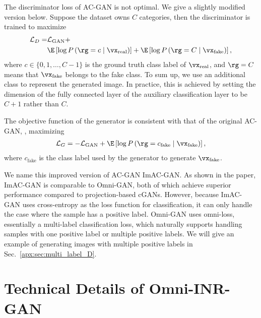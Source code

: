 \documentclass[paper_2425.tex]{subfiles}
\begin{document}
The discriminator loss of AC-GAN is not optimal. We give a slightly modified version below. Suppose the dataset owns $C$ categories, then the discriminator is trained to maximize
\begin{equation}
  \begin{aligned}
    \mathcal{L}_{{D}} = & \mathcal{L}_{\text{GAN}} +                                         \\
                        & \E \left[ \log P\left(\rg=c \mid \vx_{\text{real}}\right) \right]+
    \E \left[ \log P\left(\rg=C \mid \vx_{\text{fake}}\right) \right],
  \end{aligned}
\end{equation}
where $c \in \{0, 1, \dots, C-1\}$ is the ground truth class label of $\vx_{\text{real}}$, and $\rg=C$ means that $\vx_{\text{fake}}$ belongs to the fake class. To sum up, we use an additional class to represent the generated image. In practice, this is achieved by setting the dimension of the fully connected layer of the auxiliary classification layer to be $C+1$ rather than $C$.

The objective function of the generator is consistent with that of the original AC-GAN, \ie, maximizing
\begin{equation}
  \begin{aligned}
    \mathcal{L}_{{G}} =  - \mathcal{L}_{\text{GAN}} +
    \E \left[ \log P\left(\rg=c_{\text{fake}} \mid \vx_{\text{fake}}\right) \right],
  \end{aligned}
\end{equation}
where $c_{\text{fake}}$ is the class label used by the generator to generate $\vx_{\text{fake}}$.

We name this improved version of AC-GAN ImAC-GAN. As shown in the paper, ImAC-GAN is comparable to Omni-GAN, both of which achieve superior performance compared to projection-based cGANs. However, because ImAC-GAN uses cross-entropy as the loss function for classification, it can only handle the case where the sample has a positive label. Omni-GAN uses omni-loss, essentially a multi-label classification loss, which naturally supports handling samples with one positive label or multiple positive labels. We will give an example of generating images with multiple positive labels in Sec.~\ref{apx:sec:multi_label_D}.

\section{Technical Details of Omni-INR-GAN}
\label{apx:sec:omni_inr_gan}
\end{document}
